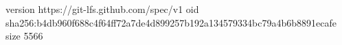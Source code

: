 version https://git-lfs.github.com/spec/v1
oid sha256:b4db960f688c4f64ff72a7de4d899257b192a134579334bc79a4b6b8891ecafe
size 5566
